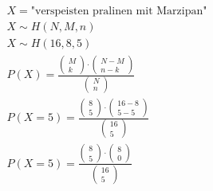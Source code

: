 \begin{align*}
    X = \text{"verspeisten pralinen mit Marzipan"}                     \\
    X \sim H\left(N, M, n\right)                                       \\
    X \sim H\left(16,  8, 5\right)                                     \\
    P(X) = \frac{\begin{pmatrix}
                         M \\ k
                     \end{pmatrix} \cdot \begin{pmatrix}
                                             N - M \\ n - k
                                         \end{pmatrix}}{\begin{pmatrix}
                                                            N \\ n
                                                        \end{pmatrix}}     \\
    P(X = 5) = \frac{\begin{pmatrix}
                             8 \\ 5
                         \end{pmatrix} \cdot \begin{pmatrix}
                                                 16 - 8 \\ 5 - 5
                                             \end{pmatrix}}{\begin{pmatrix}
                                                                16 \\ 5
                                                            \end{pmatrix}} \\
    P(X = 5) = \frac{\begin{pmatrix}
                             8 \\ 5
                         \end{pmatrix} \cdot \begin{pmatrix}
                                                 8 \\ 0
                                             \end{pmatrix}}{\begin{pmatrix}
                                                                16 \\ 5

\end{pmatrix}}
\end{align*}
